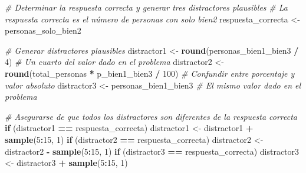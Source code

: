 \documentclass[
]{article}
\newenvironment{Shaded}{\begin{snugshade}}{\end{snugshade}}
\newcommand{\CommentTok}[1]{\textcolor[rgb]{0.56,0.35,0.01}{\textit{#1}}}
\newcommand{\ControlFlowTok}[1]{\textcolor[rgb]{0.13,0.29,0.53}{\textbf{#1}}}
\newcommand{\DecValTok}[1]{\textcolor[rgb]{0.00,0.00,0.81}{#1}}
\newcommand{\FunctionTok}[1]{\textcolor[rgb]{0.13,0.29,0.53}{\textbf{#1}}}
\newcommand{\NormalTok}[1]{#1}
\newcommand{\OtherTok}[1]{\textcolor[rgb]{0.56,0.35,0.01}{#1}}
\newcommand{\SpecialCharTok}[1]{\textcolor[rgb]{0.81,0.36,0.00}{\textbf{#1}}}
\begin{document}
\begin{Shaded}
\begin{Highlighting}[]
\CommentTok{\# Determinar la respuesta correcta y generar tres distractores plausibles}
\CommentTok{\# La respuesta correcta es el número de personas con solo bien2}
\NormalTok{respuesta\_correcta }\OtherTok{\textless{}{-}}\NormalTok{ personas\_solo\_bien2}

\CommentTok{\# Generar distractores plausibles}
\NormalTok{distractor1 }\OtherTok{\textless{}{-}} \FunctionTok{round}\NormalTok{(personas\_bien1\_bien3 }\SpecialCharTok{/} \DecValTok{4}\NormalTok{)  }\CommentTok{\# Un cuarto del valor dado en el problema}
\NormalTok{distractor2 }\OtherTok{\textless{}{-}} \FunctionTok{round}\NormalTok{(total\_personas }\SpecialCharTok{*}\NormalTok{ p\_bien1\_bien3 }\SpecialCharTok{/} \DecValTok{100}\NormalTok{)  }\CommentTok{\# Confundir entre porcentaje y valor absoluto}
\NormalTok{distractor3 }\OtherTok{\textless{}{-}}\NormalTok{ personas\_bien1\_bien3  }\CommentTok{\# El mismo valor dado en el problema}

\CommentTok{\# Asegurarse de que todos los distractores son diferentes de la respuesta correcta}
\ControlFlowTok{if}\NormalTok{ (distractor1 }\SpecialCharTok{==}\NormalTok{ respuesta\_correcta) distractor1 }\OtherTok{\textless{}{-}}\NormalTok{ distractor1 }\SpecialCharTok{+} \FunctionTok{sample}\NormalTok{(}\DecValTok{5}\SpecialCharTok{:}\DecValTok{15}\NormalTok{, }\DecValTok{1}\NormalTok{)}
\ControlFlowTok{if}\NormalTok{ (distractor2 }\SpecialCharTok{==}\NormalTok{ respuesta\_correcta) distractor2 }\OtherTok{\textless{}{-}}\NormalTok{ distractor2 }\SpecialCharTok{{-}} \FunctionTok{sample}\NormalTok{(}\DecValTok{5}\SpecialCharTok{:}\DecValTok{15}\NormalTok{, }\DecValTok{1}\NormalTok{)}
\ControlFlowTok{if}\NormalTok{ (distractor3 }\SpecialCharTok{==}\NormalTok{ respuesta\_correcta) distractor3 }\OtherTok{\textless{}{-}}\NormalTok{ distractor3 }\SpecialCharTok{+} \FunctionTok{sample}\NormalTok{(}\DecValTok{5}\SpecialCharTok{:}\DecValTok{15}\NormalTok{, }\DecValTok{1}\NormalTok{)}


\end{Highlighting}
\end{Shaded}
\end{document}
